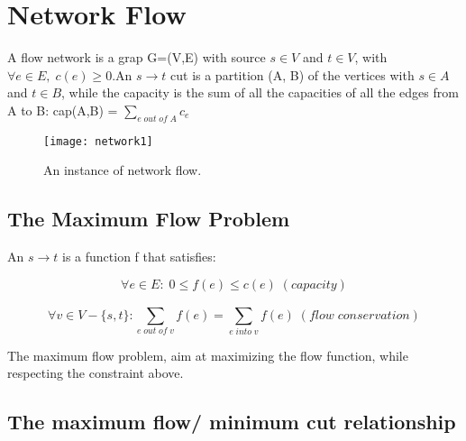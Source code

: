 \section{Network Flow}
A flow network is a grap G=(V,E) with source $s \in V$ and $t \in V$, with $\forall e \in E, \; c(e) \geq 0$.An $s \rightarrow t$ cut is a partition (A, B) of the vertices with $s \in A$ and $ t \in B$, while the capacity is the sum of all the capacities of all the edges from A to B: cap(A,B) = $ \sum_{e \; out \; of \; A}^{} c_{e}$

\begin{figure}[H]
    \centering
    \texttt{[image: network1]}
    \caption{An instance of network flow.}
\end{figure}

\subsection{The Maximum Flow Problem}
An $s \rightarrow t$ is a function f that satisfies:

\[ \forall e \in E: \; 0 \leq f(e) \leq c(e) \; (capacity)\]

\[ \forall v \in V - \{s, t\}: \sum_{e \; out \; of \; v}^{} f(e) = \sum_{e \; into \; v}^{} f(e) \; (flow \; conservation)\]

The maximum flow problem, aim at maximizing the flow function, while respecting the constraint above.

\subsection{The maximum flow/ minimum cut relationship}

